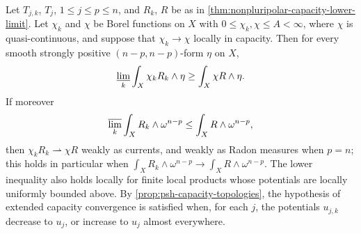 \begin{corollary}\label{cor:weighted-nonpluripolar-capacity-limits}
Let $T_{j,k}$, $T_j$, $1\leq j\leq p\leq n$, and $R_k$, $R$ be as in \cref{thm:nonpluripolar-capacity-lower-limit}. Let $\chi_k$ and $\chi$ be Borel functions on $X$ with $0\leq\chi_k,\chi\leq A<\infty$, where $\chi$ is quasi-continuous, and suppose that $\chi_k\to\chi$ locally in capacity. Then for every smooth strongly positive $(n-p,n-p)$-form $\eta$ on $X$,
\[
 \varliminf_k\int_X\chi_k R_k\wedge\eta
                          \geq\int_X\chi R\wedge\eta.
\]
If moreover
\[
 \varlimsup_k\int_XR_k\wedge\omega^{n-p}
                         \leq\int_XR\wedge\omega^{n-p},
\]
then $\chi_kR_k\rightharpoonup\chi R$ weakly as currents, and weakly as Radon measures when $p=n$; this holds in particular when $\int_XR_k\wedge\omega^{n-p}\to\int_XR\wedge\omega^{n-p}$. The lower inequality also holds locally for finite local products whose potentials are locally uniformly bounded above. By \cref{prop:psh-capacity-topologies}, the hypothesis of extended capacity convergence is satisfied when, for each $j$, the potentials $u_{j,k}$ decrease to $u_j$, or increase to $u_j$ almost everywhere.
\end{corollary}
